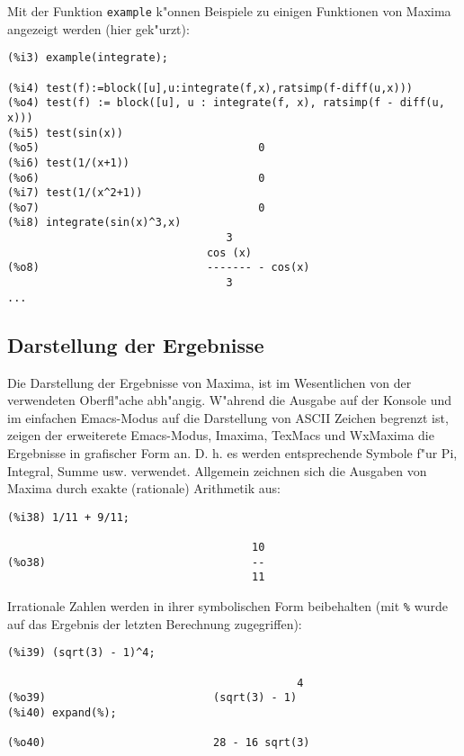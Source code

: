 \documentclass[spanish,12pt,a4paper]{article}
\begin{document}
Mit der Funktion \verb|example| k"onnen Beispiele zu einigen Funktionen von Maxima angezeigt werden (hier gek"urzt):
\scriptsize
\begin{verbatim}
(%i3) example(integrate);

(%i4) test(f):=block([u],u:integrate(f,x),ratsimp(f-diff(u,x)))
(%o4) test(f) := block([u], u : integrate(f, x), ratsimp(f - diff(u, x)))
(%i5) test(sin(x))
(%o5)                                  0
(%i6) test(1/(x+1))
(%o6)                                  0
(%i7) test(1/(x^2+1))
(%o7)                                  0
(%i8) integrate(sin(x)^3,x)
                                  3
                               cos (x)
(%o8)                          ------- - cos(x)
                                  3
...
\end{verbatim}
\normalsize

\subsection{Darstellung der Ergebnisse}


Die Darstellung der Ergebnisse von Maxima, ist im Wesentlichen von der verwendeten Oberfl"ache abh"angig. W"ahrend die Ausgabe auf der Konsole und im einfachen Emacs-Modus auf die Darstellung von ASCII Zeichen begrenzt ist, zeigen der erweiterete Emacs-Modus, Imaxima, TexMacs und WxMaxima die Ergebnisse in grafischer Form an. D. h. es werden entsprechende Symbole f"ur Pi, Integral, Summe usw. verwendet.
Allgemein zeichnen sich die Ausgaben von Maxima durch exakte (rationale) Arithmetik aus:

\scriptsize
\begin{verbatim}
(%i38) 1/11 + 9/11;

                                      10
(%o38)                                --
                                      11
\end{verbatim}
\normalsize


Irrationale Zahlen werden in ihrer symbolischen Form beibehalten (mit \verb|%| wurde auf das Ergebnis der letzten Berechnung zugegriffen):

\scriptsize
\begin{verbatim}
(%i39) (sqrt(3) - 1)^4;

                                             4
(%o39)                          (sqrt(3) - 1)
(%i40) expand(%);

(%o40)                          28 - 16 sqrt(3)
\end{verbatim}
\normalsize
\end{document}
